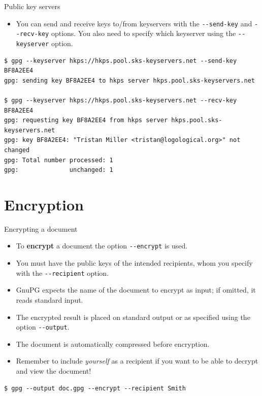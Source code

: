 \documentclass[%
mode=present,%
paper=smartboard,
size=20pt,
]{powerdot}
\newcommand\vsp{\vspace{-16mm}}
\newcommand{\clopt}[1]{\texttt{{-}#1}}
\begin{document}
\makeatletter\renewcommand{\verbatim@font}{\footnotesize\tt}\makeatother
\begin{slide}[method=direct,toc=]{Public key servers}
  \begin{itemize}
  \item You can send and receive keys to/from keyservers with the
    \clopt{-send-key} and \clopt{-recv-key} options.  You also need to
    specify which keyserver using the \clopt{-keyserver} option.
  \end{itemize}
\begin{verbatim}
$ gpg --keyserver hkps://hkps.pool.sks-keyservers.net --send-key BF8A2EE4
gpg: sending key BF8A2EE4 to hkps server hkps.pool.sks-keyservers.net

$ gpg --keyserver hkps://hkps.pool.sks-keyservers.net --recv-key BF8A2EE4
gpg: requesting key BF8A2EE4 from hkps server hkps.pool.sks-keyservers.net
gpg: key BF8A2EE4: "Tristan Miller <tristan@logological.org>" not changed
gpg: Total number processed: 1
gpg:              unchanged: 1
\end{verbatim}
\end{slide}

\section{Encryption}

\begin{slide}[method=direct]{Encrypting a document}
  \begin{itemize}
  \item To \textbf{encrypt} a document the option \clopt{-encrypt} is
    used.
  \item You must have the public keys of the intended recipients, whom
    you specify with the \clopt{-recipient} option.
  \item GnuPG expects the name of the document to encrypt as input; if
    omitted, it reads standard input.
  \item The encrypted result is placed on standard output or as
    specified using the option \clopt{-output}.
  \item The document is automatically compressed before encryption.
  \item Remember to include \emph{yourself} as a recipient if you want
    to be able to decrypt and view the document!
  \end{itemize}
\vsp
\begin{verbatim}
$ gpg --output doc.gpg --encrypt --recipient Smith
\end{verbatim}
\end{slide}
\end{document}
